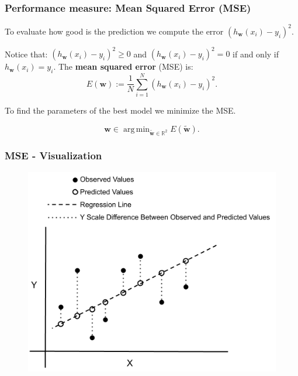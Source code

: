 \documentclass{beamer}
\DeclareMathOperator*{\argmin}{arg\,min}
\begin{document}
	\begin{frame}
		\frametitle{Performance measure: Mean Squared Error (MSE)}
		To evaluate how good is the prediction we compute the error $(h_{\bm{w}}(x_i) - y_i)^2$.
		
		\vspace{5 mm}
		
		Notice that: $(h_{\bm{w}}(x_i) - y_i)^2 \geq 0$ and $(h_{\bm{w}}(x_i) - y_i)^2 = 0$ if and only if $h_{\bm{w}}(x_i) = y_i$. The \textbf{mean squared error} (MSE) is:
		$$E({\bm{w}}) := \frac{1}{N} \sum_{i=1}^{N} (h_{\bm{w}}(x_i) - y_i)^2.$$
		
		To find the parameters of the best model we minimize the MSE.
		
		$$\bm{w} \in \argmin_{\tilde{\bm{w}} \in \mathbb{R}^2} E(\tilde{\bm{w}}).$$
		
	\end{frame}

	\begin{frame}
		\frametitle{MSE - Visualization}
		\begin{figure}
			\centering
			\includegraphics[scale=0.5]{images/mse}
		\end{figure}
	\end{frame}
\end{document}
